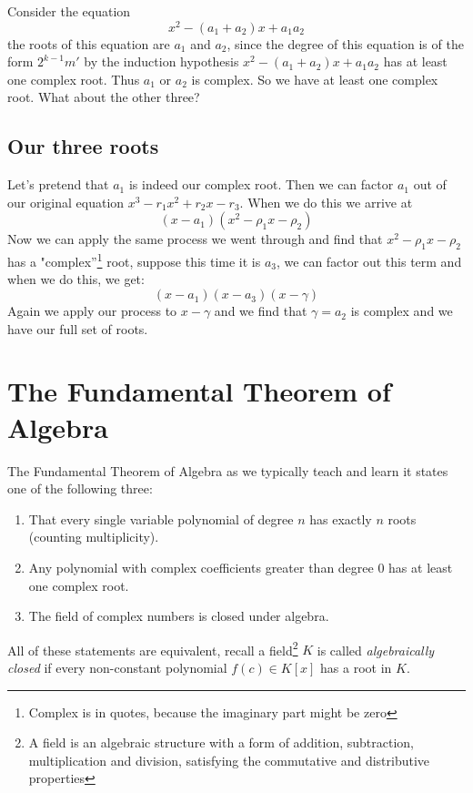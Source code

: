 \documentclass[12pt]{article}
\begin{document}
Consider the equation $$x^2 - (a_1 + a_2)x + a_1 a_2$$  the roots of this equation are $a_1$ and $a_2$, since the degree of this equation is of the form $2^{k-1}m'$ by the induction hypothesis $x^2 - (a_1 + a_2)x + a_1 a_2$ has at least one complex root.  Thus $a_1$ or $a_2$ is complex.  So we have at least one complex root.  What about the other three?

\subsection*{Our three roots}
Let's pretend that $a_1$ is indeed our complex root.  Then we can factor $a_1$ out of our original equation $x^3 -r_1 x^2 +r_2 x - r_3$.  When we do this we arrive at
$$(x-a_1)(x^2 - \rho_1 x - \rho_2)$$
Now we can apply the same process we went through and find that $x^2 - \rho_1 x - \rho_2$ has a "complex''\footnote{Complex is in quotes, because the imaginary part might be zero} root, suppose this time it is $a_3$, we can factor out this term and when we do this, we get:
$$(x-a_1)(x-a_3)(x-\gamma)$$
Again we apply our process to $x-\gamma$ and we find that $\gamma=a_2$ is complex and we have our full set of roots.









\section*{The Fundamental Theorem of Algebra}
The Fundamental Theorem of Algebra as we typically teach and learn it states one of the following three: 
\begin{enumerate}
\item That every single variable polynomial of degree $n$ has exactly $n$ roots (counting multiplicity).
\item Any polynomial with complex coefficients greater than degree 0 has at least one complex root.  
\item The field of complex numbers is closed under algebra.
\end{enumerate}

All of these statements are equivalent, recall a field\footnote{A field is an algebraic structure with a form of addition, subtraction, multiplication and division, satisfying the commutative and distributive properties} $K$ is called \emph{algebraically closed} if every non-constant polynomial $f(c) \in K[x]$ has a root in $K$.
\end{document}

